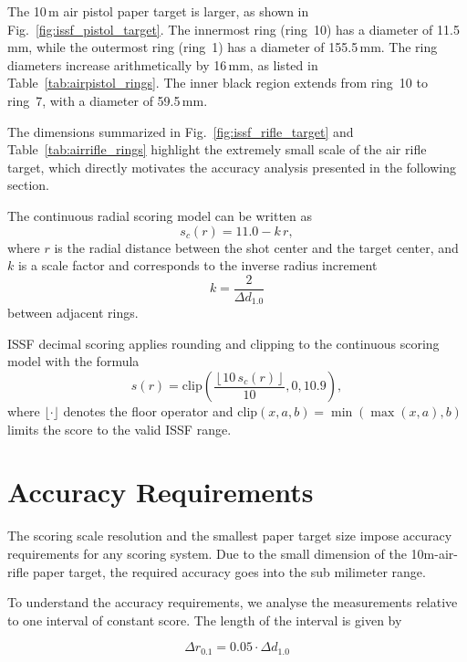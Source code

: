 The 10\,m air pistol paper target is larger, as shown in Fig.~\ref{fig:issf_pistol_target}.
The innermost ring (ring~10) has a diameter of 11.5\,mm, while the outermost ring (ring~1)
has a diameter of 155.5\,mm. The ring diameters increase arithmetically by 16\,mm, as listed
in Table~\ref{tab:airpistol_rings}. The inner black region extends from ring~10 to ring~7,
with a diameter of 59.5\,mm.

The dimensions summarized in Fig.~\ref{fig:issf_rifle_target} and
Table~\ref{tab:airrifle_rings} highlight the extremely small scale of the air rifle target,
which directly motivates the accuracy analysis presented in the following section.

The continuous radial scoring model can be written as
\begin{equation}
  s_c(r) = 11.0 - k\,r ,
  \label{eq:continuous_score}
\end{equation}
where $r$ is the radial distance between the shot center and the target center, and $k$ is a
scale factor and corresponds to the inverse radius increment
\begin{equation}
    k = \frac{2}{\Delta d_{1.0}}
\end{equation}
between adjacent rings.

ISSF decimal scoring applies rounding and clipping to the continuous scoring model with the formula
\begin{equation}
  s(r) =
  \mathrm{clip}\!\left(
    \frac{\left\lfloor 10\, s_c(r) \right\rfloor}{10},
    0,
    10.9
  \right),
  \label{eq:issf_decimal_score}
\end{equation}
where $\lfloor \cdot \rfloor$ denotes the floor operator and
$\mathrm{clip}(x,a,b)=\min(\max(x,a),b)$ limits the score to the valid ISSF range.

\section{Accuracy Requirements}

The scoring scale resolution and the smallest paper target size impose accuracy requirements for any scoring system.
Due to the small dimension of the 10m-air-rifle paper target, the required accuracy goes into the sub milimeter range.

To understand the accuracy requirements, we analyse the measurements relative to one interval of constant score. The length of the interval
is given by

\begin{equation}
  \Delta r_{0.1} = 0.05 \cdot \Delta d_{1.0}
\end{equation}

